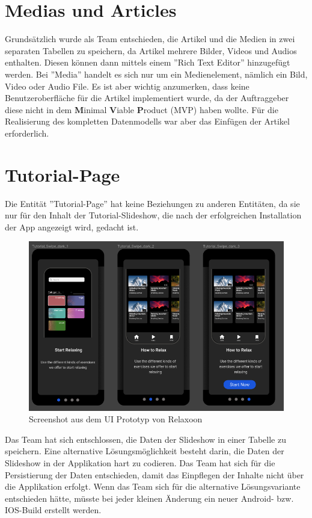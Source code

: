 \section{Medias und Articles}

Grundsätzlich wurde als Team entschieden,
die Artikel und die Medien in zwei separaten Tabellen zu speichern,
da Artikel mehrere Bilder, Videos und Audios enthalten.
Diesen können dann mittels einem ''Rich Text Editor'' hinzugefügt werden.
Bei ''Media'' handelt es sich nur um ein Medienelement,
nämlich ein Bild, Video oder Audio File. Es ist aber wichtig anzumerken,
dass keine Benutzeroberfläche für die Artikel implementiert wurde, da der Auftraggeber
diese nicht in dem \textbf{M}inimal \textbf{V}iable \textbf{P}roduct (MVP) haben wollte.
Für die Realisierung des kompletten Datenmodells war aber das Einfügen der Artikel erforderlich.

\section{Tutorial-Page}
\label{Tutorial-Page}
Die Entität ''Tutorial-Page'' hat keine Beziehungen zu anderen Entitäten, da sie nur für den Inhalt der Tutorial-Slideshow,
die nach der erfolgreichen Installation der App angezeigt wird, gedacht ist.

\begin{figure}[H]
  \centering
  \includegraphics[height=0.5\textwidth]{./pics/slideshow.png}
  \caption{Screenshot aus dem UI Prototyp von Relaxoon}
\end{figure}

Das Team hat sich entschlossen, die Daten der Slideshow in einer Tabelle zu speichern.
Eine alternative Lösungsmöglichkeit besteht darin, die Daten der Slideshow in der Applikation hart zu codieren.
Das Team hat sich für die Persistierung der Daten entschieden, damit das Einpflegen der Inhalte nicht über die Applikation erfolgt.
Wenn das Team sich für die alternative Lösungsvariante entschieden hätte, müsste bei jeder kleinen Änderung ein neuer Android- bzw. IOS-Build erstellt werden.

